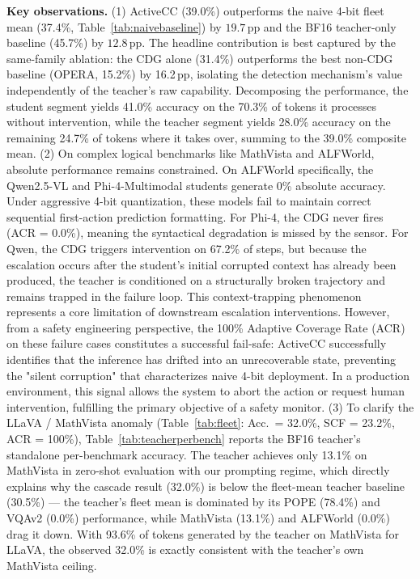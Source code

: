 \documentclass{ieeetmlcn}
\begin{document}
\noindent\textbf{Key observations.} (1) ActiveCC (39.0\%) outperforms the naive 4-bit fleet mean (37.4\%, Table~\ref{tab:naivebaseline}) by $19.7$\,pp and the BF16 teacher-only baseline (45.7\%) by $12.8$\,pp. The headline contribution is best captured by the same-family ablation: the CDG alone (31.4\%) outperforms the best non-CDG baseline (OPERA, 15.2\%) by 16.2\,pp, isolating the detection mechanism's value independently of the teacher's raw capability. Decomposing the performance, the student segment yields 41.0\% accuracy on the 70.3\% of tokens it processes without intervention, while the teacher segment yields 28.0\% accuracy on the remaining 24.7\% of tokens where it takes over, summing to the 39.0\% composite mean.
(2) On complex logical benchmarks like MathVista and ALFWorld, absolute performance remains constrained. On ALFWorld specifically, the Qwen2.5-VL and Phi-4-Multimodal students generate 0\% absolute accuracy. Under aggressive 4-bit quantization, these models fail to maintain correct sequential first-action prediction formatting. For Phi-4, the CDG never fires (ACR = 0.0\%), meaning the syntactical degradation is missed by the sensor. For Qwen, the CDG triggers intervention on 67.2\% of steps, but because the escalation occurs after the student's initial corrupted context has already been produced, the teacher is conditioned on a structurally broken trajectory and remains trapped in the failure loop. This context-trapping phenomenon represents a core limitation of downstream escalation interventions. However, from a safety engineering perspective, the 100\% Adaptive Coverage Rate (ACR) on these failure cases constitutes a successful fail-safe: ActiveCC successfully identifies that the inference has drifted into an unrecoverable state, preventing the "silent corruption" that characterizes naive 4-bit deployment. In a production environment, this signal allows the system to abort the action or request human intervention, fulfilling the primary objective of a safety monitor.
(3) To clarify the LLaVA / MathVista anomaly (Table~\ref{tab:fleet}: Acc.\ = 32.0\%, SCF = 23.2\%, ACR = 100\%), Table~\ref{tab:teacherperbench} reports the BF16 teacher's standalone per-benchmark accuracy. The teacher achieves only 13.1\% on MathVista in zero-shot evaluation with our prompting regime, which directly explains why the cascade result (32.0\%) is below the fleet-mean teacher baseline (30.5\%) --- the teacher's fleet mean is dominated by its POPE (78.4\%) and VQAv2 (0.0\%) performance, while MathVista (13.1\%) and ALFWorld (0.0\%) drag it down. With 93.6\% of tokens generated by the teacher on MathVista for LLaVA, the observed 32.0\% is exactly consistent with the teacher's own MathVista ceiling.
\end{document}
